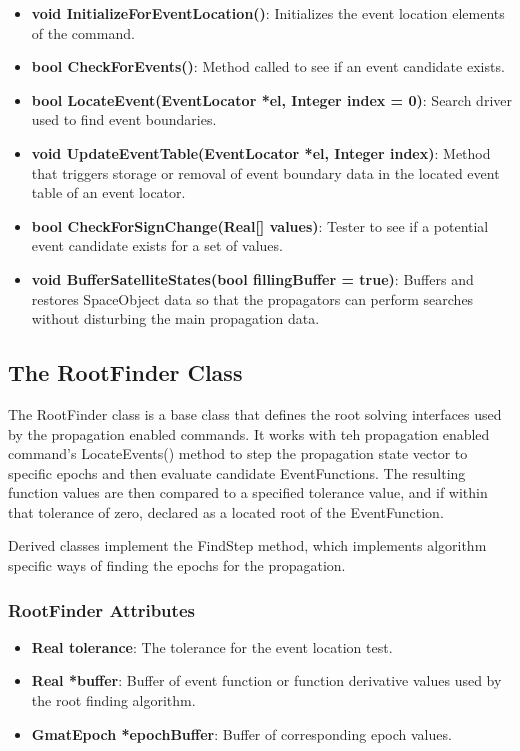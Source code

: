 \documentclass[letterpaper,10pt]{article}
\begin{document}
\begin{itemize}
\item \textbf{void InitializeForEventLocation()}: Initializes the event
location elements of the command.
\item \textbf{bool CheckForEvents()}: Method called to see if an event candidate
exists.
\item \textbf{bool LocateEvent(EventLocator *el, Integer index = 0)}: Search
driver used to find event boundaries.
\item \textbf{void UpdateEventTable(EventLocator *el, Integer index)}: Method
that triggers storage or removal of event boundary data in the located event
table of an event locator.
\item \textbf{bool CheckForSignChange(Real[] values)}:  Tester to see if a
potential event candidate exists for a set of values.
\item \textbf{void BufferSatelliteStates(bool fillingBuffer = true)}: Buffers
and restores SpaceObject data so that the propagators can perform searches
without disturbing the main propagation data.
\end{itemize}

\subsection{The RootFinder Class}

The RootFinder class is a base class that defines the root solving interfaces
used by the propagation enabled commands.  It works with teh propagation
enabled command's LocateEvents() method to step the propagation state vector to
specific epochs and then evaluate candidate EventFunctions.  The resulting
function values are then compared to a specified tolerance value, and if within
that tolerance of zero, declared as a located root of the EventFunction. 

Derived classes implement the FindStep method, which implements algorithm
specific ways of finding the epochs for the propagation.

\subsubsection{RootFinder Attributes}

\begin{itemize}
\item \textbf{Real tolerance}: The tolerance for the event location test.
\item \textbf{Real *buffer}: Buffer of event function or function derivative
values used by the root finding algorithm.
\item \textbf{GmatEpoch *epochBuffer}: Buffer of corresponding epoch values.
\end{itemize}
\end{document}
